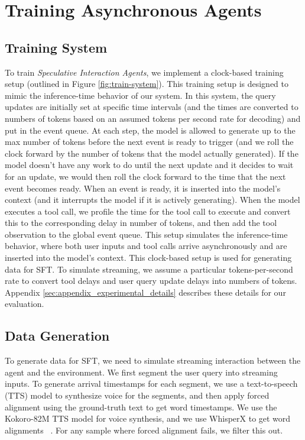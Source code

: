 \section{Training Asynchronous Agents}

\subsection{Training System}
\label{sec:training-details}

To train \textit{Speculative Interaction Agents},
we implement a clock-based training setup (outlined in Figure \ref{fig:train-system}).
This training setup is designed to mimic the inference-time behavior of our system.
In this system, the query updates are initially set at specific time intervals (and the times are converted to numbers of tokens based on an assumed tokens per second rate for decoding) and put in the event queue.
At each step, the model is allowed to generate up to the max number of tokens before the next event is ready to trigger (and we roll the clock forward by the number of tokens that the model actually generated).
If the model doesn't have any work to do until the next update and it decides to wait for an update, we would then roll the clock forward to the time that the next event becomes ready.
When an event is ready, it is inserted into the model's context (and it interrupts the model if it is actively generating).
When the model executes a tool call, we profile the time for the tool call to execute and convert this to the corresponding delay in number of tokens, and then add the tool observation to the global event queue.
This setup simulates the inference-time behavior, where both user inputs and tool calls arrive asynchronously and are inserted into the model's context.
This clock-based setup is used for generating data for SFT.
To simulate streaming, we assume a particular tokens-per-second rate to convert tool delays and user query update delays into numbers of tokens.
Appendix \ref{sec:appendix_experimental_details} describes these details for our evaluation.

\subsection{Data Generation}
\label{sec:data-generation}

To generate data for SFT, we need to simulate streaming interaction between the agent and the environment. 
We first segment the user query into streaming inputs.
To generate arrival timestamps for each segment, we use a text-to-speech (TTS) model to synthesize voice for the segments, and then apply forced alignment using the ground-truth text to get word timestamps.
We use the Kokoro-82M TTS model for voice synthesis, and we use WhisperX to get word alignments ~\citep{kokoro82m,bain2022whisperx}. 
For any sample where forced alignment fails, we filter this out.


